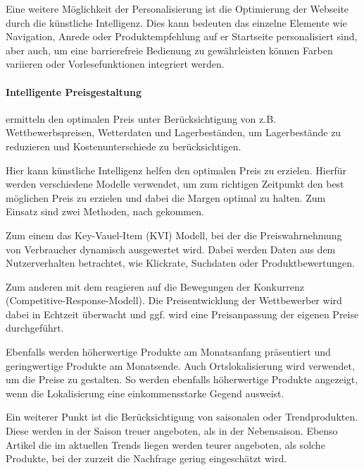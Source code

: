Eine weitere Möglichkeit der Personalisierung ist die Optimierung der Webseite durch die künstliche Intelligenz. Dies kann bedeuten das einzelne Elemente wie Navigation, Anrede oder Produktempfehlung auf er Startseite personalisiert sind, aber auch, um eine barrierefreie Bedienung zu gewährleisten können Farben variieren oder Vorlesefunktionen integriert werden.

\paragraph{Intelligente Preisgestaltung} ermitteln den optimalen Preis unter Berücksichtigung von z.B. Wettbewerbspreisen, Wetterdaten und Lagerbeständen, um Lagerbestände zu reduzieren und Kostenunterschiede zu berücksichtigen.\vspace{0.2cm}

Hier kann künstliche Intelligenz helfen den optimalen Preis zu erzielen. Hierfür werden verschiedene Modelle verwendet, um zum richtigen Zeitpunkt den best möglichen Preis zu erzielen und dabei die Margen optimal zu halten. Zum Einsatz sind zwei Methoden, nach \cite{mckinsey_dynamic_pricing} gekommen.\vspace{0.2cm}

Zum einem das Key-Vauel-Item (KVI) Modell, bei der die Preiswahrnehmung von Verbraucher dynamisch ausgewertet wird. Dabei werden Daten aus dem Nutzerverhalten betrachtet, wie Klickrate, Suchdaten oder Produktbewertungen.\vspace{0.2cm}

Zum anderen mit dem reagieren auf die Bewegungen der Konkurrenz (Competitive-Response-Modell). Die Preisentwicklung der Wettbewerber wird dabei in Echtzeit überwacht und ggf. wird eine Preisanpassung der eigenen Preise durchgeführt.\vspace{0.2cm}

Ebenfalls werden höherwertige Produkte am Monatsanfang präsentiert und geringwertige Produkte am Monatsende. Auch Ortslokalisierung wird verwendet, um die Preise zu gestalten. So werden ebenfalls höherwertige Produkte angezeigt, wenn die Lokalisierung eine einkommensstarke Gegend ausweist.\vspace{0.2cm}

Ein weiterer Punkt ist die Berücksichtigung von saisonalen oder Trendprodukten. Diese werden in der Saison treuer angeboten, als in der Nebensaison. Ebenso Artikel die im aktuellen Trends liegen werden teurer angeboten, als solche Produkte, bei der zurzeit die Nachfrage gering eingeschätzt wird.

